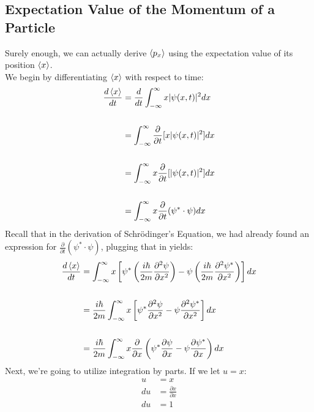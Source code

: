 \documentclass[hidelinks, a4paper, 12pt]{article}
\newcommand{\n}{\\[\baselineskip]}
\begin{document}
        \subsection{Expectation Value of the Momentum of a Particle}
            Surely enough, we can actually derive $\braket{p_x}$ using the expectation value of its position $\braket{x}$.\n
            We begin by differentiating $\braket{x}$ with respect to time:
            \[\begin{split}
                \frac{d\braket{x}}{dt} &= \frac{d}{dt} \int_{-\infty}^{\infty} x|\psi(x,t)|^2dx\\
                \\
                &= \int_{-\infty}^{\infty} \frac{\partial}{\partial t} [x|\psi(x,t)|^2]dx\\
                \\
                &= \int_{-\infty}^{\infty} x \frac{\partial}{\partial t} [|\psi(x,t)|^2]dx\\
                \\
                &= \int_{-\infty}^{\infty} x \frac{\partial}{\partial t} (\psi^* \cdot \psi)dx\\
            \end{split}\]
            Recall that in the derivation of Schrödinger's Equation, we had already found an expression for $\frac{\partial}{\partial t}(\psi^* \cdot \psi)$, plugging that in yields:
            \[\begin{split}
                \frac{d\braket{x}}{dt} &= \int_{-\infty}^{\infty} x \left[\psi^* \left(\frac{i\hbar}{2m} \frac{\partial^2 \psi}{\partial x^2}\right) - \psi \left(\frac{i\hbar}{2m} \frac{\partial^2 \psi^*}{\partial x^2}\right)\right] dx\\
                \\
                &= \frac{i\hbar}{2m} \int_{-\infty}^{\infty} x \left[\psi^* \frac{\partial^2 \psi}{\partial x^2} - \psi \frac{\partial^2 \psi^*}{\partial x^2}\right] dx\\
                \\
                &= \frac{i\hbar}{2m} \int_{-\infty}^{\infty} x \frac{\partial}{\partial x} \left(\psi^* \frac{\partial \psi}{\partial x} - \psi \frac{\partial \psi^*}{\partial x}\right) dx\\
            \end{split}\]
            Next, we're going to utilize integration by parts. If we let $u = x$:
            \[\begin{split}
                u &= x\\
                du &= \frac{\partial x}{\partial x}\\
                du &= 1
            \end{split}\]
\end{document}
